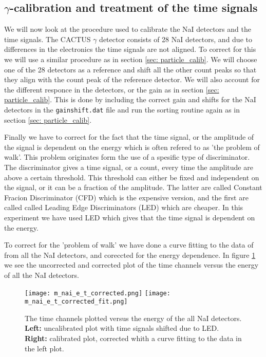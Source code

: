 \documentclass[11pt,a4wide]{article}
\begin{document}
\subsection{$\gamma$-calibration and treatment of the time signals}
We will now look at the procedure used to calibrate the NaI detectors and the time signals. The CACTUS $\gamma$ detector consists of 28 NaI detectors, and due to differences in the electronics the time signals are not aligned. To correct for this we will use a similar procedure as in section \ref{sec: particle_calib}. We will choose one of the 28 detectors as a reference and shift all the other count peaks so that they align with the count peak of the reference detector. We will also account for the different responce in the detectors, or the gain as in section \ref{sec: particle_calib}. This is done by including the correct gain and shifts for the NaI detectors in the \texttt{gainshift.dat} file and run the sorting routine again as in section \ref{sec: particle_calib}.

Finally we have to correct for the fact that the time signal, or the amplitude of the signal is dependent on the energy which is often refered to as 'the problem of walk'. This problem originates form the use of a spesific type of discriminator. The discriminator gives a time signal, or a count, every time the amplitude are above a certain threshold. This threshold can either be fixed and independent on the signal, or it can be a fraction of the amplitude. The latter are called Constant Fracion Discriminator (CFD) which is the expensive version, and the first are called called Leading Edge Discriminators (LED) which are cheaper. In this experiment we have used LED which gives that the time signal is dependent on the energy. 

To correct for the 'problem of walk' we have done a curve fitting to the data of from all the NaI detectors, and coreccted for the energy dependence. In figure \ref{fig: time_corr} we see the uncorrected and corrected plot of the time channels versus the energy of all the NaI detectors.

\begin{figure}[htp]
\centering
\texttt{[image: m\_nai\_e\_t\_corrected.png]}
\texttt{[image: m\_nai\_e\_t\_corrected\_fit.png]}
\caption{The time channels plotted versus the energy of the all NaI detectors. \textbf{Left:} uncalibrated plot with time signals shifted due to LED. \textbf{Right:} calibrated plot, corrected whith a curve fitting to the data in the left plot.}
\label{fig: time_corr}
\end{figure}
\end{document}

